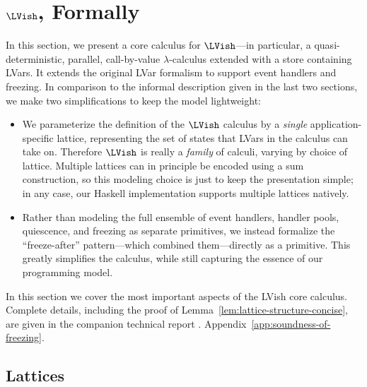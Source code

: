 \section{$\LVish$, Formally}\label{section:language}

In this section, we present a core calculus for $\LVish$---in particular, a
quasi-deterministic, parallel, call-by-value $\lambda$-calculus extended with a
store containing LVars.  It extends the original LVar formalism to support event
handlers and freezing.  In comparison to the informal description given in the
last two sections, we make two simplifications to keep the model lightweight:
\begin{itemize}
\item We parameterize the definition of the $\LVish$ calculus by a \emph{single}
  application-specific lattice, representing the set of states that LVars in the
  calculus can take on. Therefore $\LVish$ is really a \emph{family} of
  calculi, varying by choice of lattice.  Multiple lattices can in principle be
  encoded using a sum construction, so this modeling choice is just to keep the
  presentation simple; in any case, our Haskell implementation supports multiple
  lattices natively.
\item Rather than modeling the full ensemble of event handlers, handler pools,
  quiescence, and freezing as separate primitives, we instead formalize the
  ``freeze-after'' pattern---which combined them---directly as a primitive.
  This greatly simplifies the calculus, while still capturing the
  essence of our programming model.
\end{itemize}

\noindent In this section we cover the most important aspects of the
LVish core calculus.  Complete details, including the proof of
Lemma~\ref{lem:lattice-structure-concise},
 are given in
\ifx\fulltr\undefined
the companion
technical report \cite{Freeze-TR}.
\else
Appendix~\ref{app:soundness-of-freezing}.
\fi

\subsection{Lattices}


